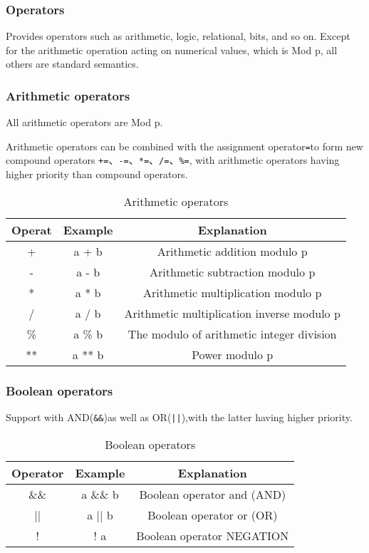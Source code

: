 \subsubsection{Operators}

Provides operators such as arithmetic, logic, relational, bits, and so on. Except for the arithmetic operation acting on numerical values, which is Mod p, all others are standard semantics. 

\subsubsection*{Arithmetic operators}

All arithmetic operators are Mod p.

Arithmetic operators can be combined with the assignment operator\texttt{=}to form new compound operators \texttt{+=}、\texttt{-=}、\texttt{*=}、\texttt{/=}、\texttt{\%=}, with arithmetic operators having higher priority than compound operators. 

\begin{table}
\centering
\begin{tabular}{c|c|c}
Operat & Example & Explanation \\ \hline
+ & a + b & Arithmetic addition modulo p \\
- & a - b & Arithmetic subtraction modulo p \\
* & a * b & Arithmetic multiplication modulo p \\
/ & a / b & Arithmetic multiplication inverse modulo p \\
\% & a \% b & The modulo of arithmetic integer division \\
** & a ** b & Power modulo p \\
\end{tabular}
\caption{Arithmetic operators}
\end{table}

\subsubsection*{Boolean operators}

Support with AND(\texttt{\&\&})as well as OR(\texttt{||}),with the latter having higher priority.

\begin{table}
\centering
\begin{tabular}{c|c|c}
Operator & Example & Explanation \\ \hline
\&\& & a \&\& b & Boolean operator and (AND) \\
|| & a || b & Boolean operator or (OR) \\
! & ! a & Boolean operator NEGATION \\
\end{tabular}
\caption{Boolean operators}
\end{table}

